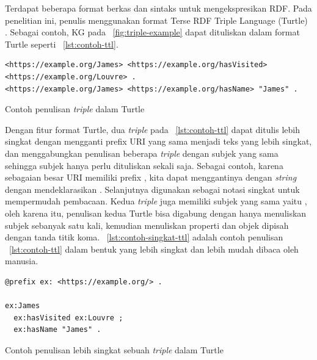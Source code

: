 Terdapat beberapa format berkas dan sintaks untuk mengekspresikan RDF. Pada penelitian ini, penulis
menggunakan format Terse RDF Triple Language (Turtle) \citep{turtle}. Sebagai contoh, KG pada
\pic~\ref{fig:triple-example} dapat dituliskan dalam format Turtle seperti
\lst~\ref{lst:contoh-ttl}.

\begin{listing}[H]
  \begin{verbatim}
<https://example.org/James> <https://example.org/hasVisited> <https://example.org/Louvre> .
<https://example.org/James> <https://example.org/hasName> "James" .
\end{verbatim}
  \caption{Contoh penulisan \textit{triple} dalam Turtle}
  \label{lst:contoh-ttl}
\end{listing}

Dengan fitur format Turtle, dua \textit{triple} pada \lst~\ref{lst:contoh-ttl} dapat ditulis lebih
singkat dengan mengganti prefix URI yang sama menjadi teks yang lebih singkat, dan menggabungkan
penulisan beberapa \textit{triple} dengan subjek yang sama sehingga subjek hanya perlu dituliskan
sekali saja. Sebagai contoh, karena sebagaian besar URI memiliki prefix ,
kita dapat menggantinya dengan \textit{string}  dengan mendeklarasikan
. Selanjutnya  digunakan sebagai notasi singkat
 untuk mempermudah pembacaan. Kedua \textit{triple} juga memiliki subjek
yang sama yaitu , oleh karena itu, penulisan kedua Turtle bisa digabung dengan hanya
menuliskan subjek sebanyak satu kali, kemudian menuliskan properti dan objek dipisah dengan tanda
titik koma. \lst~\ref{lst:contoh-singkat-ttl} adalah contoh penulisan \lst~\ref{lst:contoh-ttl}
dalam bentuk yang lebih singkat dan lebih mudah dibaca oleh manusia.

\begin{listing}[H]
  \begin{verbatim}
@prefix ex: <https://example.org/> .

ex:James 
  ex:hasVisited ex:Louvre ;
  ex:hasName "James" .
\end{verbatim}
  \caption{Contoh penulisan lebih singkat sebuah \textit{triple} dalam Turtle}
  \label{lst:contoh-singkat-ttl}
\end{listing}


